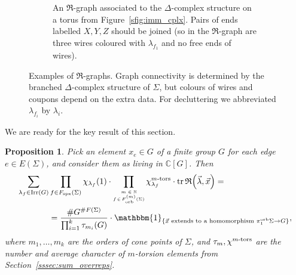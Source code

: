 \documentclass{amsart}
\newtheorem{proposition}[conjecture]{Proposition}
\newcommand{\Fspx}{F_{\textnormal{spx}}}
\newcommand{\Forb}[1][m]{F^{(#1)}_{\textnormal{orb}}}
\newcommand{\iterorb}{{\tiny\begin{matrix}m\in\mathbb{N}\\f\!\in\!\Forb(\Sigma)\end{matrix}}}
\newcommand{\pio}{\pi_1^{\textnormal{orb}}}
\newcommand{\tn}{\textnormal}
\newcommand{\tr}{\operatorname{tr}}
\begin{document}
\begin{figure}[h]
\begin{subfigure}{\textwidth}
\begin{tikzpicture}
\end{tikzpicture}
\caption{An $\mathfrak{R}$-graph associated to the $\Delta$-complex structure on a torus from Figure~\ref{sfig:imm_cplx}. Pairs of ends labelled $X,Y,Z$ should be joined (so in the $\mathfrak{R}$-graph are three wires coloured with $\lambda_{f_1}$ and no free ends of wires).}
\end{subfigure}
\caption{Examples of $\mathfrak{R}$-graphs. Graph connectivity is determined by the branched $\Delta$-complex structure of $\Sigma$, but colours of wires and coupons depend on the extra data. For decluttering we abbreviated $\lambda_{f_i}$ by $\lambda_i$.}
\label{fig:Rg_example}
\end{figure}

We are ready for the key result of this section.
\begin{proposition}\label{prop:Rg_trace}
Pick an element $x_e\in G$ of a finite group $G$ for each edge $e\in E(\Sigma)$, and consider them as living in $\mathbb{C}[G]$. Then
\begin{align*}
\sum_{\lambda_f\in\tn{Irr}(G)}&\prod_{f\in\Fspx(\Sigma)}\chi_{\lambda_f}(1)\cdot\prod_\iterorb\chi_{\lambda_f}^{m\tn{-tors}}\cdot\tr\mathfrak{R}\Big(\vec\lambda,\vec{x}\Big)=\\
&=\frac{\#G^{\#F(\Sigma)}}{\prod_{i=1}^k\tau_{m_i}(G)}\cdot\mathbbm{1}_{\{\vec{x}\text{ extends to a homomorphism }\pio\Sigma\to G\}},
\end{align*}
where $m_1,\dots,m_k$ are the orders of cone points of $\Sigma$, and $\tau_m,\chi^{m\tn{-tors}}$ are the number and average character of $m$-torsion elements from Section~\ref{sssec:sum_overreps}.
\end{proposition}
\end{document}
